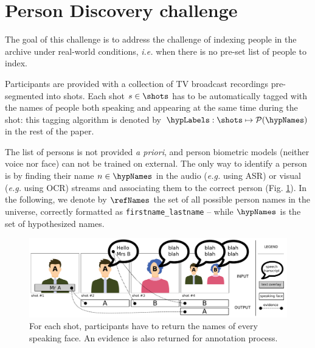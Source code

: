 \section{Person Discovery challenge}
\label{sec:challenge}


The goal of this challenge is to address the challenge of indexing people in the archive under real-world conditions, \emph{i.e.} when there is no pre-set list of people to index.

 Participants are provided with a collection of TV broadcast recordings pre-segmented into shots.
Each shot $s \in \shots$ has to be automatically tagged with the names of people both speaking and appearing at the same time during the shot: this tagging algorithm is denoted by $\hypLabels : \shots \mapsto \mathcal{P}(\hypNames)$ in the rest of the paper.

The list of persons is not provided \emph{a priori}, and person biometric models (neither voice nor face) can not be trained on external. The only way to identify a person is by finding their name $n \in \hypNames$ in the audio (\emph{e.g.} using ASR) or visual (\emph{e.g.} using OCR) streams and associating them to the correct person (Fig. \ref{fig:evidence}). %
In the following, we denote by $\refNames$ the set of all possible person names in the universe, correctly formatted as \texttt{firstname\_lastname} -- while $\hypNames$ is the set of hypothesized names.

\begin{figure}[!htb]
 \centering
 \includegraphics[width=1.\linewidth]{evidence.pdf}

 \caption{For each shot, participants have to return the names of every speaking face. An evidence is also returned for annotation process.}
 \label{fig:evidence}
\end{figure}

